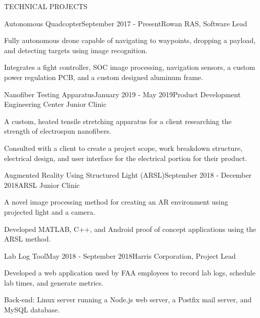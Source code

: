 \documentclass{resume} %
\begin{document}
\begin{rSection}{TECHNICAL PROJECTS}

  \begin{rSubsection}{Autonomous Quadcopter}{September 2017 - Present}{Rowan
      RAS, Software Lead}{}
  \item Fully autonomous drone capable of navigating to waypoints, dropping a
    payload, and detecting targets using image recognition.
  \item Integrates a fight controller, SOC image processing, navigation sensors,
    a custom power regulation PCB, and a custom designed aluminum frame.
  \end{rSubsection}


  \begin{rSubsection}{Nanofiber Testing Apparatus}{January 2019 - May 2019}{Product Development Engineering Center Junior Clinic}{}
  \item A custom, heated tensile stretching apparatus for a client researching the strength of electrospun nanofibers.
  \item Consulted with a client to create a project scope, work breakdown
    structure, electrical design, and user interface for the electrical portion
    for their product.
  \end{rSubsection}


  \begin{rSubsection}{Augmented Reality Using Structured Light (ARSL)}{September
      2018 - December 2018}{ARSL Junior Clinic}{}
  \item A novel image processing method for creating an AR environment using projected light and a camera.
  \item Developed MATLAB, C++, and Android proof of concept applications using the
    ARSL method.
  \end{rSubsection}


  \begin{rSubsection}{Lab Log Tool}{May 2018 - September 2018}{Harris Corporation, Project Lead}{}
  \item Developed a web application used by FAA employees to record lab logs, schedule lab times, and generate metrics.
  \item Back-end: Linux server running a Node.js web server, a Postfix mail server, and MySQL database.
  \end{rSubsection}


\end{rSection}
\end{document}
